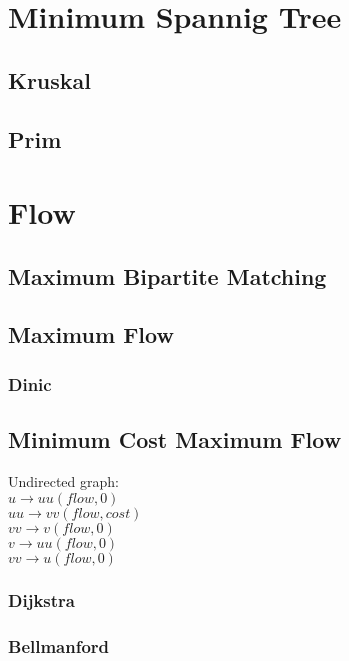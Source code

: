 \documentclass[10pt,a4paper]{report}
\begin{document}
	\section{Minimum Spannig Tree}
		\subsection{Kruskal}
		\subsection{Prim}
	
	\newpage
	\section{Flow}
		\subsection{Maximum Bipartite Matching}
			
		\newpage
		\subsection{Maximum Flow}
			\subsubsection{Dinic}
				
		\newpage
		\subsection{Minimum Cost Maximum Flow}
			Undirected graph:\\
			$u \rightarrow uu(flow, 0)$\\
			$uu \rightarrow vv(flow, cost)$\\
			$vv \rightarrow v(flow, 0)$\\
			$v \rightarrow uu(flow, 0)$\\
			$vv \rightarrow u(flow, 0)$
			\subsubsection{Dijkstra}
				
			\newpage
			\subsubsection{Bellmanford}
\end{document}
